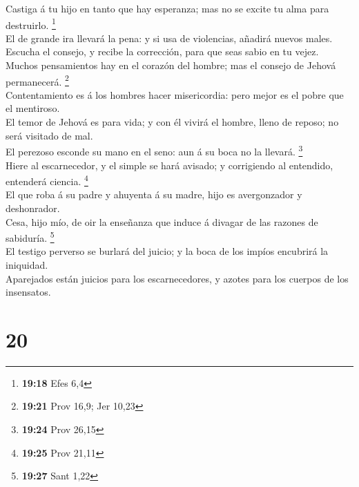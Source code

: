  Castiga á tu hijo en tanto que hay esperanza; mas no se
excite tu alma para destruirlo. \footnote{\textbf{19:18} Efes 6,4}\\
 El de grande ira llevará la pena: y si usa de violencias,
añadirá nuevos males.\\
 Escucha el consejo, y recibe la corrección, para que seas
sabio en tu vejez.\\
 Muchos pensamientos hay en el corazón del hombre; mas el
consejo de Jehová permanecerá. \footnote{\textbf{19:21} Prov 16,9; Jer
  10,23}\\
 Contentamiento es á los hombres hacer misericordia: pero
mejor es el pobre que el mentiroso.\\
 El temor de Jehová es para vida; y con él vivirá el
hombre, lleno de reposo; no será visitado de mal.\\
 El perezoso esconde su mano en el seno: aun á su boca no
la llevará. \footnote{\textbf{19:24} Prov 26,15}\\
 Hiere al escarnecedor, y el simple se hará avisado; y
corrigiendo al entendido, entenderá ciencia. \footnote{\textbf{19:25}
  Prov 21,11}\\
 El que roba á su padre y ahuyenta á su madre, hijo es
avergonzador y deshonrador.\\
 Cesa, hijo mío, de oir la enseñanza que induce á divagar
de las razones de sabiduría. \footnote{\textbf{19:27} Sant 1,22}\\
 El testigo perverso se burlará del juicio; y la boca de
los impíos encubrirá la iniquidad.\\
 Aparejados están juicios para los escarnecedores, y azotes
para los cuerpos de los insensatos.

\hypertarget{section-19}{%
\section{20}\label{section-19}}

